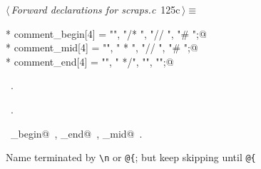 \documentclass[a4paper]{report}
\begin{document}
\begin{flushleft} \small
\begin{minipage}{\linewidth}\label{scrap266}\raggedright\small
{} $\langle\,${\it Forward declarations for scraps.c}\nobreak\ {\footnotesize {125c}}$\,\rangle\equiv$
\vspace{-1ex}
\begin{list}{}{} \item
\mbox{}\verb@char * comment_begin[4] = { "", "/* ", "// ", "# "};@\\
\mbox{}\verb@char * comment_mid[4] = { "", " * ", "// ", "# "};@\\
\mbox{}\verb@char * comment_end[4] = { "", " */", "", ""};@\\
\mbox{}\verb@@{\NWsep}
\end{list}
\vspace{-1.5ex}
\footnotesize
\begin{list}{}{\setlength{\itemsep}{-\parsep}\setlength{\itemindent}{-\leftmargin}}
\item \NWtxtMacroDefBy\ .
\item \NWtxtMacroRefIn\ .
\item \NWtxtIdentsDefed\nobreak\  \verb@comment_begin@\nobreak\ , \verb@comment_end@\nobreak\ , \verb@comment_mid@\nobreak\ .
\item{}
\end{list}
\end{minipage}\vspace{4ex}
\end{flushleft}
Name terminated by \verb+\n+ or \verb+@{+; but keep skipping until \verb+@{+
\end{document}
